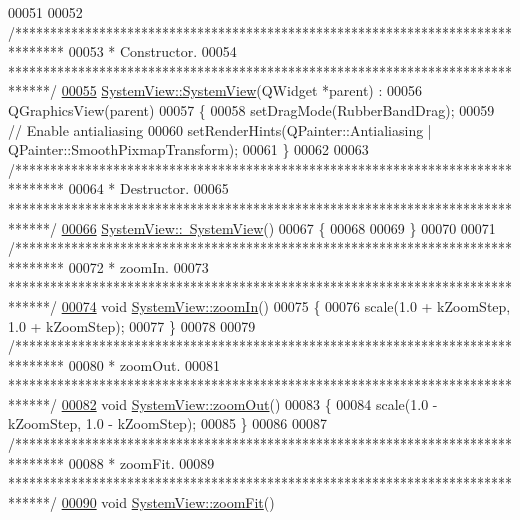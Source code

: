 \begin{DoxyCode}
00051 
00052 \textcolor{comment}{/*******************************************************************************}
00053 \textcolor{comment}{ * Constructor.}
00054 \textcolor{comment}{ ******************************************************************************/}
\hypertarget{systemview_8cpp_source_l00055}{}\hyperlink{group___graphics_ga660a455ff7b98cb92410b0bf1cbb2eeb}{00055} \hyperlink{group___graphics_ga660a455ff7b98cb92410b0bf1cbb2eeb}{SystemView::SystemView}(QWidget *parent) :
00056   QGraphicsView(parent)
00057 \{
00058   setDragMode(RubberBandDrag);
00059   \textcolor{comment}{// Enable antialiasing}
00060   setRenderHints(QPainter::Antialiasing | QPainter::SmoothPixmapTransform);
00061 \}
00062 
00063 \textcolor{comment}{/*******************************************************************************}
00064 \textcolor{comment}{ * Destructor.}
00065 \textcolor{comment}{ ******************************************************************************/}
\hypertarget{systemview_8cpp_source_l00066}{}\hyperlink{group___graphics_ga0091352981c1efa5498819b69698db44}{00066} \hyperlink{group___graphics_ga0091352981c1efa5498819b69698db44}{SystemView::~SystemView}()
00067 \{
00068 
00069 \}
00070 
00071 \textcolor{comment}{/*******************************************************************************}
00072 \textcolor{comment}{ * zoomIn.}
00073 \textcolor{comment}{ ******************************************************************************/}
\hypertarget{systemview_8cpp_source_l00074}{}\hyperlink{group___graphics_ga93170319ee5fbf9098353b383fc8a368}{00074} \textcolor{keywordtype}{void} \hyperlink{group___graphics_ga93170319ee5fbf9098353b383fc8a368}{SystemView::zoomIn}()
00075 \{
00076   scale(1.0 + kZoomStep, 1.0 + kZoomStep);
00077 \}
00078 
00079 \textcolor{comment}{/*******************************************************************************}
00080 \textcolor{comment}{ * zoomOut.}
00081 \textcolor{comment}{ ******************************************************************************/}
\hypertarget{systemview_8cpp_source_l00082}{}\hyperlink{group___graphics_gaf971471c76265ec21cdde2aafe9b609f}{00082} \textcolor{keywordtype}{void} \hyperlink{group___graphics_gaf971471c76265ec21cdde2aafe9b609f}{SystemView::zoomOut}()
00083 \{
00084   scale(1.0 - kZoomStep, 1.0 - kZoomStep);
00085 \}
00086 
00087 \textcolor{comment}{/*******************************************************************************}
00088 \textcolor{comment}{ * zoomFit.}
00089 \textcolor{comment}{ ******************************************************************************/}
\hypertarget{systemview_8cpp_source_l00090}{}\hyperlink{group___graphics_gac1bf0b6a80216df74a8da1cb8ac5f0e8}{00090} \textcolor{keywordtype}{void} \hyperlink{group___graphics_gac1bf0b6a80216df74a8da1cb8ac5f0e8}{SystemView::zoomFit}()

\end{DoxyCode}
